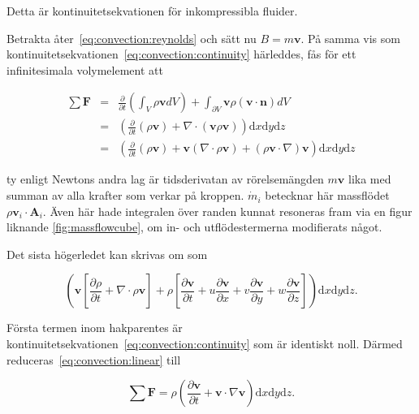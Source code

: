 Detta är kontinuitetsekvationen för inkompressibla fluider.

Betrakta åter~\eqref{eq:convection:reynolds} och sätt nu $B = m\mathbf{v}$. På samma vis som kontinuitetsekvationen~\eqref{eq:convection:continuity} härleddes, fås för ett infinitesimala volymelement att

\begin{eqnarray}
\label{eq:convection:linear}
\sum \mathbf{F} & = & \frac{\partial}{\partial t} \left( \int_V \rho\mathbf{v} dV \right) + \int_{\partial V} \mathbf{v}\rho\left( \mathbf{v} \cdot \mathbf{n}\right)dV \nonumber \\
& = &\left(\frac{\partial}{\partial t} \left( \rho\mathbf{v} \right) + \nabla \cdot \left( \mathbf{v} \rho \mathbf{v}\right)\right)\mathrm{d}x\mathrm{d}y\mathrm{d}z \nonumber\\
& = &\left( \frac{\partial}{\partial t} \left( \rho\mathbf{v} \right) + \mathbf{v}\left(\nabla\cdot\rho\mathbf{v}\right) + \left(\rho\mathbf{v} \cdot \nabla\right) \mathbf{v}\right) \mathrm{d}x\mathrm{d}y\mathrm{d}z
\end{eqnarray}

ty enligt Newtons andra lag är tidsderivatan av rörelsemängden $m\mathbf{v}$ lika med summan av alla krafter som verkar på kroppen. $\dot{m}_i$ betecknar här massflödet $\rho\mathbf{v}_i\cdot\mathbf{A}_i$. Även här hade integralen över randen kunnat resoneras fram via en figur liknande \ref{fig:massflowcube}, om in- och utflödestermerna modifierats något.

Det sista högerledet kan skrivas om som

\begin{equation}
\left( \mathbf{v}\left[ \frac{\partial \rho}{\partial t} + \nabla\cdot \rho \mathbf{v}\right] + \rho\left[ \frac{\partial \mathbf{v}}{\partial t} + u\frac{\partial\mathbf{v}}{\partial x} + v\frac{\partial\mathbf{v}}{\partial y} + w\frac{\partial\mathbf{v}}{\partial z} \right]\right)\mathrm{d}x\mathrm{d}y\mathrm{d}z.
\end{equation}

Första termen inom hakparentes är kontinuitetsekvationen~\eqref{eq:convection:continuity} som är identiskt noll. Därmed reduceras~\eqref{eq:convection:linear} till

\begin{equation}
\label{eq:convection:linearfinal}
\sum \mathbf{F} = \rho \left( \frac{\partial \mathbf{v}}{\partial t} + \mathbf{v}\cdot \nabla\mathbf{v} \right)\mathrm{d}x\mathrm{d}y\mathrm{d}z.
\end{equation}

